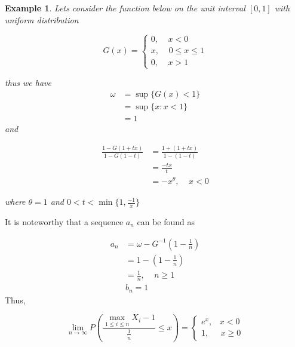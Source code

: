 \documentclass[11pt,a4paper]{article}
\theoremstyle{plain}
\newtheorem{exmp}[fact]{Example}
\begin{document}
\begin{exmp}
Lets consider the function below on the unit interval $[0,1]$ with uniform distribution
\begin{center}
\[
  G(x)=\left\{
  \begin{array}{ll}
  0,\;\;\;\;x<0 \\
  x, \;\;\;\;0 \leq x \leq 1\\
  0, \;\;\;\;x>1
  \end{array}
  \right.
  \]
\end{center}
thus we have
\begin{equation*}
\begin{split}
\omega & = \sup \{G(x)<1 \} \\
& = \sup\{x:x<1\}\\
& = 1
\end{split}
\end{equation*}
and
\begin{center}

\begin{equation*}
\begin{split}
\frac{1-G(1+tx)}{1-G(1-t) } & =\frac{1+(1+tx)}{1-(1-t) }\\
& = \frac{-tx}{t}\\
& = -x^{\theta},\;\;\;\;x<0
\end{split}
\end{equation*}
\end{center}
where $\theta = 1$ and $0<t<\min\{1,\frac{-1}{x}\}$
\end{exmp}
It is noteworthy that a sequence $a_n$ can be found as

\begin{equation*}
\begin{split}
a_n & = \omega - G^{-1}(1-\frac{1}{n})\\
& =  1-(1-\frac{1}{n}) \\
& = \frac{1}{n},\;\;\;\; n\geq 1\\
& b_n = 1
\end{split}
\end{equation*}
Thus,

\begin{center}

\[
  \lim_{n \rightarrow \infty}P(\frac{\max_{1 \leq i \leq n }X_i-1}{\frac{1}{n}}\leq x)=\left\{
  \begin{array}{ll}
  e^{x},\;\;\; x< 0\\
  1, \;\;\;\;\; x \geq 0
  \end{array}
  \right.
  \]

\end{center}
\end{document}
